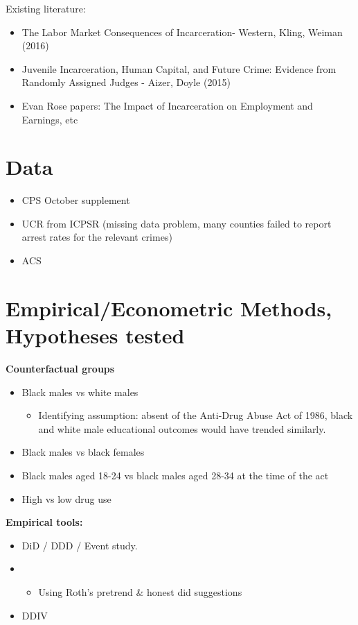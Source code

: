\documentclass{article}
\begin{document}
Existing literature:
\begin{itemize}[itemsep=0.05mm, parsep=0pt]
  \item The Labor Market Consequences of Incarceration- Western, Kling, Weiman (2016)
  \item Juvenile Incarceration, Human Capital, and Future Crime: Evidence from Randomly Assigned Judges - Aizer, Doyle (2015)
  \item Evan Rose papers: The Impact of Incarceration on Employment and Earnings, etc
\end{itemize}


\section*{Data}

\begin{itemize}[itemsep=0.05mm, parsep=0pt]
  \item CPS October supplement
  \item UCR from ICPSR (missing data problem, many counties failed to report arrest rates for the relevant crimes)
  \item ACS
\end{itemize}

\section*{Empirical/Econometric Methods, Hypotheses tested}


\textbf{Counterfactual groups}
\begin{itemize}[itemsep=0.05mm, parsep=0pt]
  \item Black males vs white males
  \begin{itemize}
    \item Identifying assumption: absent of the Anti-Drug Abuse Act of 1986, black and white male educational outcomes would have trended similarly.
  \end{itemize}
  \item Black males vs black females
  \item Black males aged 18-24 vs black males aged 28-34 at the time of the act
  \item High vs low drug use
\end{itemize}

\textbf{Empirical tools:}
\begin{itemize}[itemsep=0.05mm, parsep=0pt]
  \item DiD / DDD / Event study.
  \item \begin{itemize}
    \item Using Roth's pretrend \& honest did suggestions
  \end{itemize}
  \item DDIV
\end{itemize}
\end{document}
